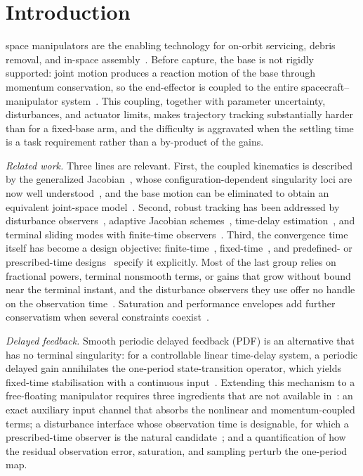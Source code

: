 \section{Introduction}
 space manipulators are the enabling technology for on-orbit servicing, debris removal, and in-space assembly~\cite{liu2021review,yoshida2003etsvii}. Before capture, the base is not rigidly supported: joint motion produces a reaction motion of the base through momentum conservation, so the end-effector is coupled to the entire spacecraft--manipulator system~\cite{dubowsky1993,papadopoulos1991nature}. This coupling, together with parameter uncertainty, disturbances, and actuator limits, makes trajectory tracking substantially harder than for a fixed-base arm, and the difficulty is aggravated when the settling time is a task requirement rather than a by-product of the gains.

\emph{Related work.} Three lines are relevant. First, the coupled kinematics is described by the generalized Jacobian~\cite{umetani1989}, whose configuration-dependent singularity loci are now well understood~\cite{papadopoulos1993,nanos2015avoiding}, and the base motion can be eliminated to obtain an equivalent joint-space model~\cite{parlaktuna2004}. Second, robust tracking has been addressed by disturbance observers~\cite{chu2008dob}, adaptive Jacobian schemes~\cite{wang2012adaptivejacobian}, time-delay estimation~\cite{wang2025tdelog}, and terminal sliding modes with finite-time observers~\cite{shao2021ntsm,dou2023fractional,dou2025fractional}. Third, the convergence time itself has become a design objective: finite-time~\cite{jia2020finite}, fixed-time~\cite{polyakov2012,hu2024constrainedfixed}, and predefined- or prescribed-time designs~\cite{xu2024se3predefined,zou2025practical,yan} specify it explicitly. Most of the last group relies on fractional powers, terminal nonsmooth terms, or gains that grow without bound near the terminal instant, and the disturbance observers they use offer no handle on the observation time~\cite{yan}. Saturation and performance envelopes add further conservatism when several constraints coexist~\cite{zhou2025saturated}.

\emph{Delayed feedback.} Smooth periodic delayed feedback (PDF) is an alternative that has no terminal singularity: for a controllable linear time-delay system, a periodic delayed gain annihilates the one-period state-transition operator, which yields fixed-time stabilisation with a continuous input~\cite{pyragas1992,zhouFixedtimeStabilizationLinear2022}. Extending this mechanism to a free-floating manipulator requires three ingredients that are not available in~\cite{zhouFixedtimeStabilizationLinear2022}: an exact auxiliary input channel that absorbs the nonlinear and momentum-coupled terms; a disturbance interface whose observation time is designable, for which a prescribed-time observer is the natural candidate~\cite{jiangPrescribedtimeDisturbanceObserver2024}; and a quantification of how the residual observation error, saturation, and sampling perturb the one-period map.

